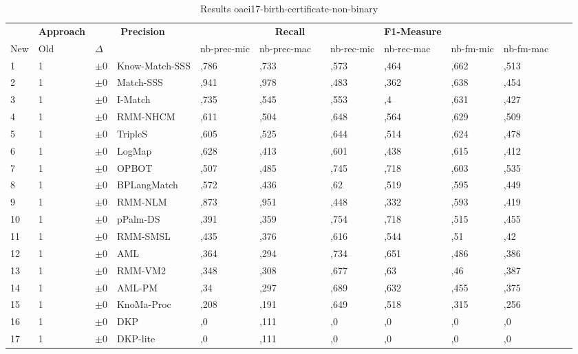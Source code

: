 \begin{table}[htb]
\setlength{\tabcolsep}{0.5em}
\centering
\scriptsize
\begin{tabular}[tb]{lllp{2.3cm}llllllllll}
\noalign{\smallskip}\hline\noalign{\smallskip}
\multicolumn{3}{c}{\textbf{Rank}}& \textbf{Approach}  & \multicolumn{2}{c}{\textbf{Precision}}  & \hspace*{1mm}  & \multicolumn{2}{c}{\textbf{Recall}}  & \hspace*{1mm}  & \multicolumn{2}{c}{\textbf{F1-Measure}}  & \hspace*{1mm} \\
New & Old & $\Delta$ & &nb-prec-mic & nb-prec-mac && nb-rec-mic & nb-rec-mac && nb-fm-mic & nb-fm-mac\\
\noalign{\smallskip}\hline\noalign{\smallskip}
1 & 1 		& $\pm$0 &Know-Match-SSS    	&	,786 & ,733 & & ,573 & ,464 & & ,662 & ,513\\
2 & 1 		& $\pm$0 &Match-SSS    	&	,941 & ,978 & & ,483 & ,362 & & ,638 & ,454\\
3 & 1 		& $\pm$0 &I-Match    	&	,735 & ,545 & & ,553 & ,4 & & ,631 & ,427\\
4 & 1 		& $\pm$0 &RMM-NHCM    	&	,611 & ,504 & & ,648 & ,564 & & ,629 & ,509\\
5 & 1 		& $\pm$0 &TripleS    	&	,605 & ,525 & & ,644 & ,514 & & ,624 & ,478\\
6 & 1 		& $\pm$0 &LogMap    	&	,628 & ,413 & & ,601 & ,438 & & ,615 & ,412\\
7 & 1 		& $\pm$0 &OPBOT    	&	,507 & ,485 & & ,745 & ,718 & & ,603 & ,535\\
8 & 1 		& $\pm$0 &BPLangMatch    	&	,572 & ,436 & & ,62 & ,519 & & ,595 & ,449\\
9 & 1 		& $\pm$0 &RMM-NLM    	&	,873 & ,951 & & ,448 & ,332 & & ,593 & ,419\\
10 & 1 		& $\pm$0 &pPalm-DS    	&	,391 & ,359 & & ,754 & ,718 & & ,515 & ,455\\
11 & 1 		& $\pm$0 &RMM-SMSL    	&	,435 & ,376 & & ,616 & ,544 & & ,51 & ,42\\
12 & 1 		& $\pm$0 &AML    	&	,364 & ,294 & & ,734 & ,651 & & ,486 & ,386\\
13 & 1 		& $\pm$0 &RMM-VM2    	&	,348 & ,308 & & ,677 & ,63 & & ,46 & ,387\\
14 & 1 		& $\pm$0 &AML-PM    	&	,34 & ,297 & & ,689 & ,632 & & ,455 & ,375\\
15 & 1 		& $\pm$0 &KnoMa-Proc    	&	,208 & ,191 & & ,649 & ,518 & & ,315 & ,256\\
16 & 1 		& $\pm$0 &DKP    	&	,0 & ,111 & & ,0 & ,0 & & ,0 & ,0\\
17 & 1 		& $\pm$0 &DKP-lite    	&	,0 & ,111 & & ,0 & ,0 & & ,0 & ,0\\
\end{tabular}
\caption{Results oaei17-birth-certificate-non-binary}
\label{tbl:results}
\end{table}